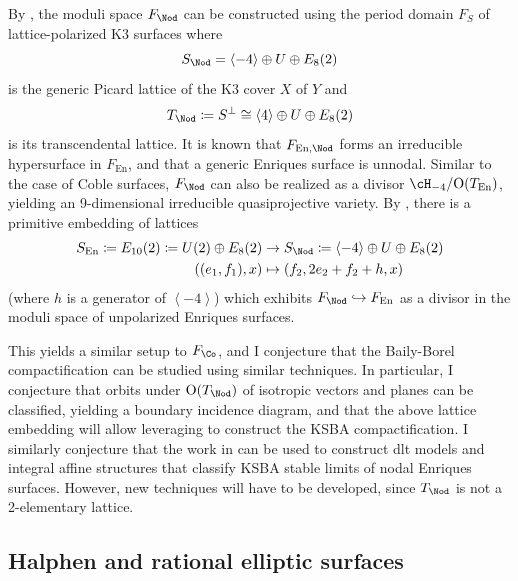 \documentclass{amsart}
\begin{document}
By \cite[\S.\,5.6]{EnriquesOne}, the moduli space \(F_{\Nod}\) can be constructed using the period domain \(F_S\) of lattice-polarized K3 surfaces where \[
S_{\Nod} = \left\langle{-4}\right\rangle \oplus U \oplus E_8(2)
\] is the generic Picard lattice of the K3 cover \(X\) of \(Y\) and \[
T_{\Nod} \coloneqq S^{\perp} \cong \left\langle{4}\right\rangle \oplus U \oplus E_8(2)
\] is its transcendental lattice. It is known that \(F_{\operatorname{En}, \Nod}\) forms an irreducible hypersurface in \(F_{\operatorname{En}}\), and that a generic Enriques surface is unnodal. Similar to the case of Coble surfaces, \(F_{\Nod}\) can also be realized as a divisor \(\cH_{-4}/{\operatorname{O}}(T_{\operatorname{En}})\), yielding an 9-dimensional irreducible quasiprojective variety. By \cite[Def.\,5.6.3]{EnriquesOne}, there is a primitive embedding of lattices \begin{align*} S_{\operatorname{En}} \coloneqq E_{10}(2) \coloneqq U(2) \oplus E_8(2) &\to S_{\Nod} \coloneqq\left\langle{-4}\right\rangle \oplus U \oplus E_8(2) \\ ((e_1, f_1), x) &\mapsto (f_2, 2e_2 + f_2 + h , x)  \end{align*} (where \(h\) is a generator of \(\left\langle{-4}\right\rangle\)) which exhibits \(F_{\Nod}\hookrightarrow F_{\operatorname{En}}\) as a divisor in the moduli space of unpolarized Enriques surfaces.

This yields a similar setup to \(F_{\Co}\), and I conjecture that the Baily-Borel compactification can be studied using similar techniques. In particular, I conjecture that orbits under \({\operatorname{O}}(T_{\Nod})\) of isotropic vectors and planes can be classified, yielding a boundary incidence diagram, and that the above lattice embedding will allow leveraging \cite{AEGS23} to construct the KSBA compactification. I similarly conjecture that the work in \cite{AEGS23} can be used to construct dlt models and integral affine structures that classify KSBA stable limits of nodal Enriques surfaces. However, new techniques will have to be developed, since \(T_{\Nod}\) is not a 2-elementary lattice.

\subsection{Halphen and rational elliptic surfaces}\label{halphen-and-rational-elliptic-surfaces}
\end{document}
